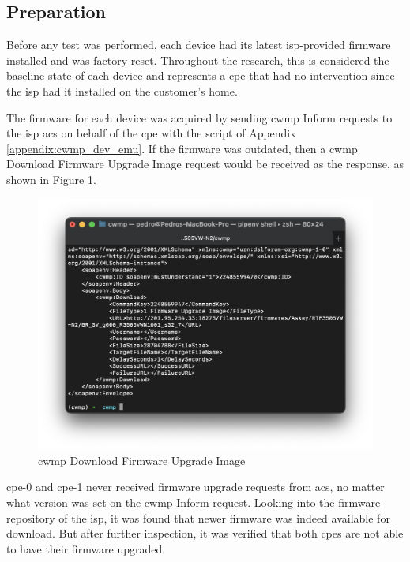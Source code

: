 \subsection{Preparation}

Before any test was performed, each device had its latest \gls{isp}-provided firmware installed and was factory reset. Throughout the research, this is considered the baseline state of each device and represents a \gls{cpe} that had no intervention since the \gls{isp} had it installed on the customer’s home.

The firmware for each device was acquired by sending \gls{cwmp} Inform requests to the \gls{isp} \gls{acs} on behalf of the \gls{cpe} with the script of Appendix \ref{appendix:cwmp_dev_emu}. If the firmware was outdated, then a \gls{cwmp} Download Firmware Upgrade Image request would be received as the response, as shown in Figure \ref{figure:cwmp_download_firmware_upgrade_image}.

\begin{figure}[h]
    \centering
    \includegraphics[width=\linewidth]{contents/cpes-and-research-data/preparation/cwmp-download-firmware-upgrade-image.png}
    \caption{\gls{cwmp} Download Firmware Upgrade Image}
    \label{figure:cwmp_download_firmware_upgrade_image}
\end{figure}

\gls{cpe}-0 and \gls{cpe}-1 never received firmware upgrade requests from \gls{acs}, no matter what version was set on the \gls{cwmp} Inform request. Looking into the firmware repository of the \gls{isp}, it was found that newer firmware was indeed available for download. But after further inspection, it was verified that both \glspl{cpe} are not able to have their firmware upgraded.

